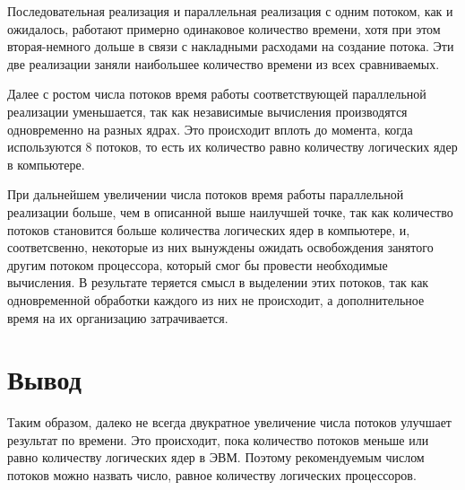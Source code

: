 Последовательная реализация и параллельная реализация с одним потоком, как и ожидалось, работают примерно одинаковое количество времени, хотя при этом вторая-немного дольше в связи с накладными расходами на создание потока. Эти две реализации заняли наибольшее количество времени из всех сравниваемых.

Далее с ростом числа потоков время работы соответствующей параллельной реализации уменьшается, так как независимые вычисления производятся одновременно на разных ядрах. Это происходит вплоть до момента, когда используются 8 потоков, то есть их количество равно количеству логических ядер в компьютере.

При дальнейшем увеличении числа потоков время работы параллельной реализации больше, чем в описанной выше наилучшей точке, так как количество потоков становится больше количества логических ядер в компьютере, и, соответсвенно, некоторые из них вынуждены ожидать освобождения занятого другим потоком процессора, который смог бы провести необходимые вычисления. В результате теряется смысл в выделении этих потоков, так как одновременной обработки каждого из них не происходит, а дополнительное время на их организацию затрачивается.



\section*{Вывод}

Таким образом, далеко не всегда двукратное увеличение числа потоков улучшает результат по времени. Это происходит, пока количество потоков меньше или равно количеству логических ядер в ЭВМ. Поэтому рекомендуемым числом потоков можно назвать число, равное количеству логических процессоров.